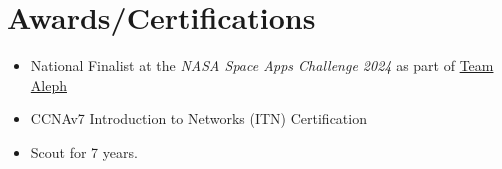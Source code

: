 \documentclass[11pt]{scrartcl}
\begin{document}
\section*{Awards/Certifications}

\begin{itemize}
	\item National Finalist at the \emph{NASA Space Apps Challenge 2024} as part of \href{https://www.spaceappschallenge.org/2023/find-a-team/aleph/?tab=project}{Team Aleph}
	\item CCNAv7 Introduction to Networks (ITN) Certification
	\item Scout for 7 years.
\end{itemize}
\end{document}
